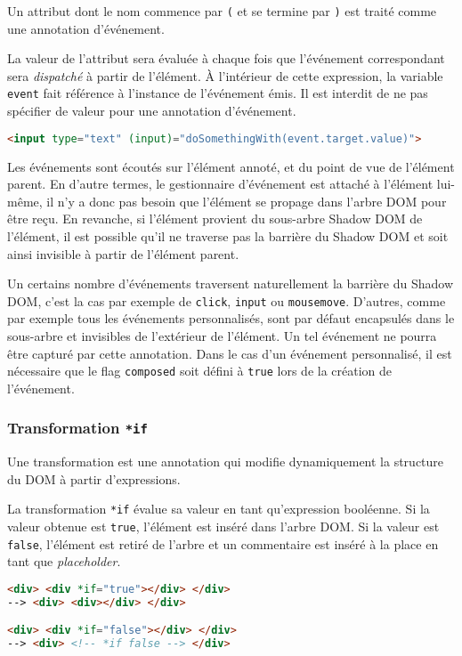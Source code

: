 Un attribut dont le nom commence par \texttt{(} et se termine par \texttt{)} est traité comme une annotation d'événement.

La valeur de l'attribut sera évaluée à chaque fois que l'événement correspondant sera \emph{dispatché} à partir de l'élément. À l'intérieur de cette expression, la variable \texttt{event} fait référence à l'instance de l'événement émis. Il est interdit de ne pas spécifier de valeur pour une annotation d'événement.

\begin{lstlisting}[language=HTML]
<input type="text" (input)="doSomethingWith(event.target.value)">
\end{lstlisting}

Les événements sont écoutés sur l'élément annoté, et du point de vue de l'élément parent. En d'autre termes, le gestionnaire d'événement est attaché à l'élément lui-même, il n'y a donc pas besoin que l'élément se propage dans l'arbre DOM pour être reçu. En revanche, si l'élément provient du sous-arbre Shadow DOM de l'élément, il est possible qu'il ne traverse pas la barrière du Shadow DOM et soit ainsi invisible à partir de l'élément parent.

Un certains nombre d'événements traversent naturellement la barrière du Shadow DOM, c'est la cas par exemple de \texttt{click}, \texttt{input} ou \texttt{mousemove}. D'autres, comme par exemple tous les événements personnalisés, sont par défaut encapsulés dans le sous-arbre et invisibles de l'extérieur de l'élément. Un tel événement ne pourra être capturé par cette annotation. Dans le cas d'un événement personnalisé, il est nécessaire que le flag \texttt{composed} soit défini à \texttt{true} lors de la création de l'événement.

\subsubsection{Transformation \texttt{*if}}
Une transformation est une annotation qui modifie dynamiquement la structure du DOM à partir d'expressions.

La transformation \texttt{*if} évalue sa valeur en tant qu'expression booléenne. Si la valeur obtenue est \texttt{true}, l'élément est inséré dans l'arbre DOM. Si la valeur est \texttt{false}, l'élément est retiré de l'arbre et un commentaire est inséré à la place en tant que \emph{placeholder}.

\begin{lstlisting}[language=HTML]
<div> <div *if="true"></div> </div>
--> <div> <div></div> </div>

<div> <div *if="false"></div> </div>
--> <div> <!-- *if false --> </div>
\end{lstlisting}

